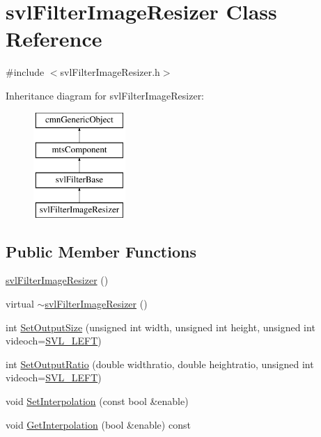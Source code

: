 \hypertarget{classsvl_filter_image_resizer}{}\section{svl\+Filter\+Image\+Resizer Class Reference}
\label{classsvl_filter_image_resizer}


{\ttfamily \#include $<$svl\+Filter\+Image\+Resizer.\+h$>$}

Inheritance diagram for svl\+Filter\+Image\+Resizer\+:\begin{figure}[H]
\begin{center}
\leavevmode
\includegraphics[height=4.000000cm]{d9/db7/classsvl_filter_image_resizer}
\end{center}
\end{figure}
\subsection*{Public Member Functions}
\begin{DoxyCompactItemize}
\item 
\hyperlink{classsvl_filter_image_resizer_ae3e87effa844cad3c956a8979ba4db14}{svl\+Filter\+Image\+Resizer} ()
\item 
virtual \hyperlink{classsvl_filter_image_resizer_a8c2cf8b7a5042af22fdb5f39dee0198f}{$\sim$svl\+Filter\+Image\+Resizer} ()
\item 
int \hyperlink{classsvl_filter_image_resizer_ac9abd4ff1c22fca8da4f6b7b038672da}{Set\+Output\+Size} (unsigned int width, unsigned int height, unsigned int videoch=\hyperlink{svl_definitions_8h_ab9fec7615f19c8df2919eebcab0b187f}{S\+V\+L\+\_\+\+L\+E\+F\+T})
\item 
int \hyperlink{classsvl_filter_image_resizer_ae2db36bb145652db37193b905f85af13}{Set\+Output\+Ratio} (double widthratio, double heightratio, unsigned int videoch=\hyperlink{svl_definitions_8h_ab9fec7615f19c8df2919eebcab0b187f}{S\+V\+L\+\_\+\+L\+E\+F\+T})
\item 
void \hyperlink{classsvl_filter_image_resizer_aa6146482b63f0bde5db22a68d16a9fbd}{Set\+Interpolation} (const bool \&enable)
\item 
void \hyperlink{classsvl_filter_image_resizer_af2ff2ccfc5360c29a757be470d38b6a3}{Get\+Interpolation} (bool \&enable) const 
\end{DoxyCompactItemize}
